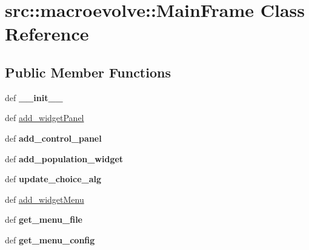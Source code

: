 \hypertarget{classsrc_1_1macroevolve_1_1MainFrame}{
\section{src::macroevolve::MainFrame Class Reference}
\label{classsrc_1_1macroevolve_1_1MainFrame}
}
\subsection*{Public Member Functions}
\begin{DoxyCompactItemize}
\item 
\hypertarget{classsrc_1_1macroevolve_1_1MainFrame_ade149a75e120826dece00311657e5a7b}{
def {\bfseries \_\-\_\-init\_\-\_\-}}
\label{classsrc_1_1macroevolve_1_1MainFrame_ade149a75e120826dece00311657e5a7b}

\item 
def \hyperlink{classsrc_1_1macroevolve_1_1MainFrame_ab2fcc6cc9d91fbacec827bef5ad402bd}{add\_\-widgetPanel}
\item 
\hypertarget{classsrc_1_1macroevolve_1_1MainFrame_adfcc163041e282fbccd9dee75303dab1}{
def {\bfseries add\_\-control\_\-panel}}
\label{classsrc_1_1macroevolve_1_1MainFrame_adfcc163041e282fbccd9dee75303dab1}

\item 
\hypertarget{classsrc_1_1macroevolve_1_1MainFrame_ad4f2b6ce45482f76d92757d903ec7910}{
def {\bfseries add\_\-population\_\-widget}}
\label{classsrc_1_1macroevolve_1_1MainFrame_ad4f2b6ce45482f76d92757d903ec7910}

\item 
\hypertarget{classsrc_1_1macroevolve_1_1MainFrame_a72d2aa2e11dfb7c9cfa53f6a7faa26d5}{
def {\bfseries update\_\-choice\_\-alg}}
\label{classsrc_1_1macroevolve_1_1MainFrame_a72d2aa2e11dfb7c9cfa53f6a7faa26d5}

\item 
def \hyperlink{classsrc_1_1macroevolve_1_1MainFrame_ae80aa2d801b9331dc63ba5f4d19c6e70}{add\_\-widgetMenu}
\item 
\hypertarget{classsrc_1_1macroevolve_1_1MainFrame_a1e276da695991bfbca2c097113f9b2a7}{
def {\bfseries get\_\-menu\_\-file}}
\label{classsrc_1_1macroevolve_1_1MainFrame_a1e276da695991bfbca2c097113f9b2a7}

\item 
\hypertarget{classsrc_1_1macroevolve_1_1MainFrame_a2f9b831dd5be76279c9ed83cf73f9d0c}{
def {\bfseries get\_\-menu\_\-config}}
\label{classsrc_1_1macroevolve_1_1MainFrame_a2f9b831dd5be76279c9ed83cf73f9d0c}


\end{DoxyCompactItemize}
